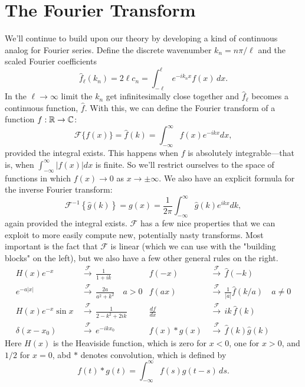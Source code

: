 \documentclass[../m180main.tex]{subfiles}
\begin{document}
\section{The Fourier Transform}
We'll continue to build upon our theory by developing a kind of continuous analog for Fourier series.
Define the discrete wavenumber $k_n = n\pi / \ell$ and the scaled Fourier coefficients
\[ \hat f_\ell (k_n) = 2\ell c_n = \int_{-\ell}^{\ell} e^{-ik_n x} f(x) \,dx. \]
In the $\ell \to \infty$ limit the $k_n$ get infinitesimally close together and $\hat f_\ell$ becomes a continuous function, $\hat f$.
With this, we can define the Fourier transform of a function $f : \mathbb{R} \to \mathbb{C}$:
\[ \mathcal F \{ f(x) \} = \hat f(k) = \int_{-\infty}^{\infty} f(x) e^{-ikx} dx, \]
provided the integral exists.
This happens when $f$ is absolutely integrable---that is, when $\int_{-\infty}^{\infty} |f(x)| dx$ is finite.
So we'll restrict ourselves to the space of functions in which $f(x) \to 0$ as $x \to \pm \infty$.
We also have an explicit formula for the inverse Fourier transform:
\[ \mathcal F^{-1} \left\{ \hat g(k) \right\} = g(x) = \frac{1}{2\pi} \int_{-\infty}^{\infty} \hat g(k) e^{ikx} dk, \]
again provided the integral exists.
$\mathcal F$ has a few nice properties that we can exploit to more easily compute new, potentially nasty transforms.
Most important is the fact that $\mathcal F$ is linear (which we can use with the "building blocks" on the left), but we also have a few other general rules on the right.
\begin{align*}
    H(x) e^{-x} &\,\overset{\mathcal F}{\longrightarrow}\, \frac{1}{1+ik} & f(-x) &\,\overset{\mathcal F}{\longrightarrow}\, \hat f(-k) \\
    e^{-a|x|} &\,\overset{\mathcal F}{\longrightarrow}\, \frac{2a}{a^2 + k^2} \quad a > 0 & f(ax) &\,\overset{\mathcal F}{\longrightarrow}\, \frac{1}{|a|} \hat f (k / a) \quad a \neq 0 \\
    H(x) e^{-x} \sin x &\,\overset{\mathcal F}{\longrightarrow}\, \frac{1}{2 - k^2 + 2ik} & \frac{df}{dx} &\,\overset{\mathcal F}{\longrightarrow}\, ik \, \hat f(k) \\
    \delta(x - x_0) &\,\overset{\mathcal F}{\longrightarrow}\, e^{-ikx_0} & f(x) * g(x) &\,\overset{\mathcal F}{\longrightarrow}\, \hat f(k) \hat g(k)
\end{align*}
Here $H(x)$ is the Heaviside function, which is zero for $x < 0$, one for $x > 0$, and $1 / 2$ for $x = 0$, abd $*$ denotes convolution, which is defined by
\[ f(t) * g(t) = \int_{-\infty}^{\infty} f(s) g(t-s) \,ds. \]
\end{document}
